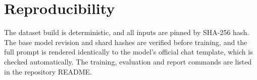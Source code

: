 \documentclass[5p,times,authoryear]{elsarticle}
\begin{document}
\section{Reproducibility}
\label{app:repro}
The dataset build is deterministic, and all inputs are pinned by SHA-256 hash. The base model revision and shard hashes are verified before training, and the full prompt is rendered identically to the model's official chat template, which is checked automatically. The training, evaluation and report commands are listed in the repository README.



\end{document}
